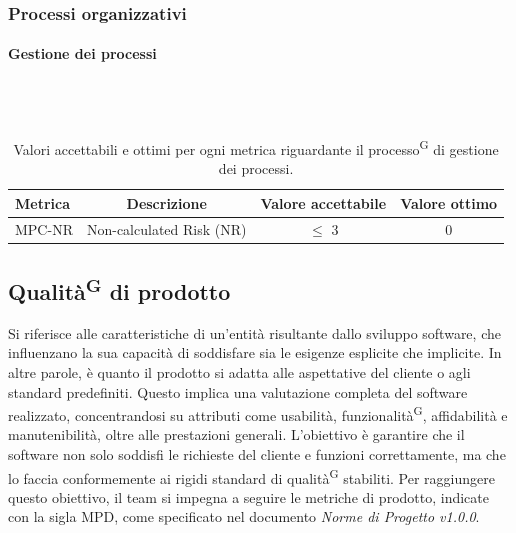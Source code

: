 \documentclass[8pt]{article}
\newcommand{\glossterm}[1]{#1\textsuperscript{G}} %
\newcommand{\subsubsubsection}[1]{\paragraph{#1}\mbox{}\\\\}
\begin{document}
\subsubsection{Processi organizzativi}
\subsubsubsection{Gestione dei processi}
\begin{table}[H]	
	\centering
	\begin{tabular}{lccc}
		\toprule
		\textbf{Metrica}& \textbf{Descrizione} & \textbf{Valore accettabile} & \textbf{Valore ottimo} \\
		\midrule
		MPC-NR & Non-calculated Risk (NR) & $\leq$ 3 & 0\\
		\bottomrule
	\end{tabular}
	\caption{Valori accettabili e ottimi per ogni metrica riguardante il \glossterm{processo} di gestione dei processi.}
	\label{table:Valori accettabili e ottimi per ogni metrica riguardante il processo di gestione dei processi.}
\end{table}
\subsection{\glossterm{Qualità} di prodotto}
Si riferisce alle caratteristiche di un'entità risultante dallo sviluppo software, che influenzano la sua capacità di soddisfare sia le esigenze esplicite che implicite. In altre parole, è quanto il prodotto si adatta alle aspettative del cliente o agli standard predefiniti. Questo implica una valutazione completa del software realizzato, concentrandosi su attributi come usabilità, \glossterm{funzionalità}, affidabilità e manutenibilità, oltre alle prestazioni generali. L'obiettivo è garantire che il software non solo soddisfi le richieste del cliente e funzioni correttamente, ma che lo faccia conformemente ai rigidi standard di \glossterm{qualità} stabiliti. Per raggiungere questo obiettivo, il team si impegna a seguire le metriche di prodotto, indicate con la sigla MPD, come specificato nel documento \textit{Norme di Progetto v1.0.0}.
\end{document}
